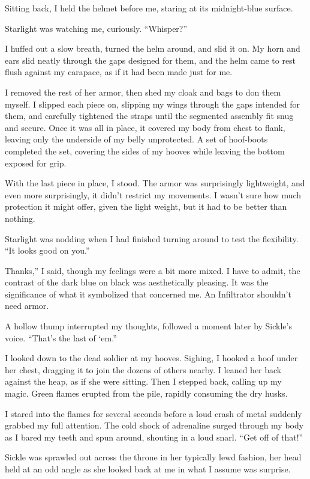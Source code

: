 Sitting back, I held the helmet before me, staring at its midnight-blue surface.

Starlight was watching me, curiously. “Whisper?”

I huffed out a slow breath, turned the helm around, and slid it on. My horn and ears slid neatly through the gaps designed for them, and the helm came to rest flush against my carapace, as if it had been made just for me.

I removed the rest of her armor, then shed my cloak and bags to don them myself. I slipped each piece on, slipping my wings through the gaps intended for them, and carefully tightened the straps until the segmented assembly fit snug and secure. Once it was all in place, it covered my body from chest to flank, leaving only the underside of my belly unprotected. A set of hoof-boots completed the set, covering the sides of my hooves while leaving the bottom exposed for grip.

With the last piece in place, I stood. The armor was surprisingly lightweight, and even more surprisingly, it didn’t restrict my movements. I wasn’t sure how much protection it might offer, given the light weight, but it had to be better than nothing.

Starlight was nodding when I had finished turning around to test the flexibility. “It looks good on you.”

\leavevmode{}Thanks,” I said, though my feelings were a bit more mixed. I have to admit, the contrast of the dark blue on black was aesthetically pleasing. It was the significance of what it symbolized that concerned me. An Infiltrator shouldn’t need armor.

A hollow thump interrupted my thoughts, followed a moment later by Sickle’s voice. “That’s the last of ‘em.”

I looked down to the dead soldier at my hooves. Sighing, I hooked a hoof under her chest, dragging it to join the dozens of others nearby. I leaned her back against the heap, as if she were sitting. Then I stepped back, calling up my magic. Green flames erupted from the pile, rapidly consuming the dry husks.

I stared into the flames for several seconds before a loud crash of metal suddenly grabbed my full attention. The cold shock of adrenaline surged through my body as I bared my teeth and spun around, shouting in a loud snarl. “Get off of that!”

Sickle was sprawled out across the throne in her typically lewd fashion, her head held at an odd angle as she looked back at me in what I assume was surprise.

